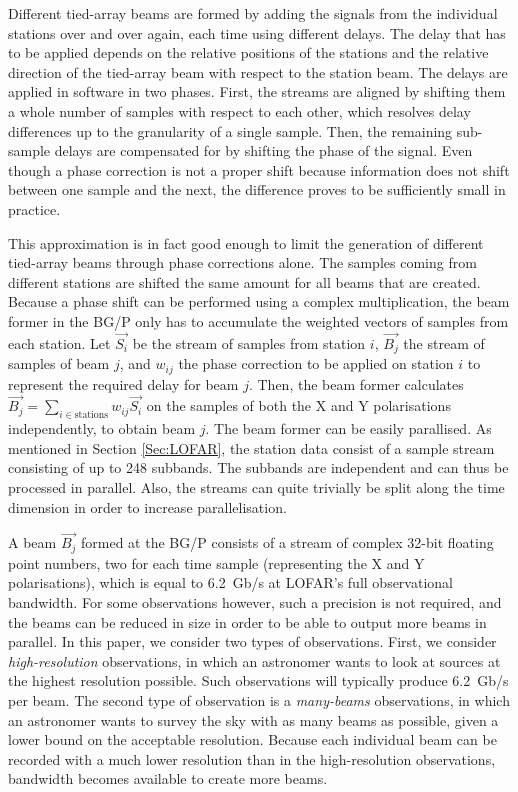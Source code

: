 \documentclass{llncs}
\begin{document}
Different tied-array beams are formed by adding the signals from the individual stations over and over again, each time using different delays. The delay that has to be applied depends on the relative positions of the stations and the relative direction of the tied-array beam with respect to the station beam. The delays are applied in software in two phases. First, the streams are aligned by shifting them a whole number of samples with respect to each other, which resolves delay differences up to the granularity of a single sample. Then, the remaining sub-sample delays are compensated for by shifting the phase of the signal. Even though a phase correction is not a proper shift because information does not shift between one sample and the next, the difference proves to be sufficiently small in practice.

This approximation is in fact good enough to limit the generation of different tied-array beams through phase corrections alone. The samples coming from different stations are shifted the same amount for all beams that are created. Because a phase shift can be performed using a complex multiplication, the beam former in the BG/P only has to accumulate the weighted vectors of samples from each station. Let $\overrightarrow{S_i}$ be the stream of samples from station $i$, $\overrightarrow{B_j}$ the stream of samples of beam $j$, and $w_{ij}$ the phase correction to be applied on station $i$ to represent the required delay for beam $j$. Then, the beam former calculates $\overrightarrow{B_j} = \sum_{i \in \textrm{stations}}w_{ij}\overrightarrow{S_i}$ on the samples of both the X and Y polarisations independently, to obtain beam $j$. The beam former can be easily parallised. As mentioned in Section \ref{Sec:LOFAR}, the station data consist of a sample stream consisting of up to 248 subbands. The subbands are independent and can thus be processed in parallel. Also, the streams can quite trivially be split along the time dimension in order to increase parallelisation. 

A beam $\overrightarrow{B_j}$ formed at the BG/P consists of a stream of complex 32-bit floating point numbers, two for each time sample (representing the X and Y polarisations), which is equal to 6.2~Gb/s at LOFAR's full observational bandwidth. For some observations however, such a precision is not required, and the beams can be reduced in size in order to be able to output more beams in parallel. In this paper, we consider two types of observations. First, we consider \emph{high-resolution} observations, in which an astronomer wants to look at sources at the highest resolution possible. Such observations will typically produce 6.2~Gb/s per beam. The second type of observation is a \emph{many-beams} observations, in which an astronomer wants to survey the sky with as many beams as possible, given a lower bound on the acceptable resolution. Because each individual beam can be recorded with a much lower resolution than in the high-resolution observations, bandwidth becomes available to create more beams.
\end{document}
